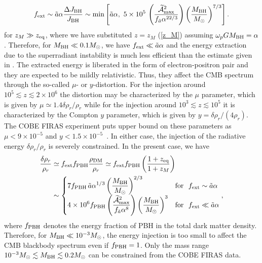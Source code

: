 \documentclass[%
 preprint,
 nofootinbib,
 amsmath,amssymb,
 aps,
 a4paper
]{revtex4-1}
\begin{document}
\begin{align}
	f_{\rm ext} \sim \tilde a\alpha\frac{\Delta J_{\rm BH}}{J_{\rm BH}} \sim 
	{\rm min}\left[\tilde a\alpha,~5\times 10^5\, \left(\frac{\widetilde{\mathcal A}_{\rm max}^2}{f_{\tilde a}\alpha^{22/3}}\right)\left(\frac{M_{\rm BH}}{M_\odot}\right)^{7/3}\right].
\end{align}
for $z_M \gg z_{\rm eq}$, where we have substituted $z=z_M$ (\ref{z_M}) assuming $\omega_p GM_{\rm BH} = \alpha$.
Therefore, for $M_{\rm BH}\ll 0.1M_\odot$, we have $f_{\rm ext} \ll \tilde a\alpha$ and the energy extraction due to the superradiant instability is much less efficient than the estimate given in \cite{Pani:2013hpa}.
The extracted energy is liberated in the form of electron-positron pair and they are expected to be mildly relativistic. 
Thus, they affect the CMB spectrum through the so-called $\mu$- or $y$-distortion. For the injection around $10^5\lesssim z \lesssim 2\times 10^6$ the distortion may be characterized by the $\mu$ parameter, which is given by $\mu \simeq 1.4 \delta \rho_r/ \rho_r$ while for the injection around $10^3\lesssim z \lesssim 10^5$ it is characterized by the Compton $y$ parameter, which is given by $y=\delta \rho_r/(4\rho_r)$. The COBE FIRAS experiment puts upper bound on these parameters as $\mu < 9\times 10^{-5}$ and $y< 1.5\times 10^{-5}$~\cite{Fixsen:1996nj}.
In either case, the injection of the radiative energy $\delta \rho_r/\rho_r$ is severely constrained. 
In the present case, we have
\begin{align}
	\frac{\delta\rho_r}{\rho_r} &\simeq f_{\rm ext} f_{\rm PBH}\frac{\rho_{\rm DM}}{\rho_r} \simeq f_{\rm ext} f_{\rm PBH}\left(\frac{1+z_{\rm eq}}{1+z_M}\right)\\
	&\sim 
	\begin{cases}
	\displaystyle 7 f_{\rm PBH}\,\tilde a \alpha^{1/3}\left(\frac{M_{\rm BH}}{M_\odot}\right)^{2/3} & {\rm for}~~f_{\rm ext} \sim \tilde a \alpha \\
	\displaystyle 4\times 10^6 f_{\rm PBH}\left(\frac{\widetilde{\mathcal A}_{\rm max}^2}{f_{\tilde a}\alpha^8}\right)\left(\frac{M_{\rm BH}}{M_\odot}\right)^3 & {\rm for}~~f_{\rm ext} \ll \tilde a \alpha
	\end{cases},
\end{align}
where $f_{\rm PBH}$ denotes the energy fraction of PBH in the total dark matter density.
Therefore, for $M_{\rm BH} \ll 10^{-3} M_\odot$, the energy injection is too small to affect the CMB blackbody spectrum even if $f_{\rm PBH}=1$. Only the mass range $10^{-3}M_\odot \lesssim M_{\rm BH} \lesssim 0.2 M_\odot$ can be constrained from the COBE FIRAS data.
\end{document}
